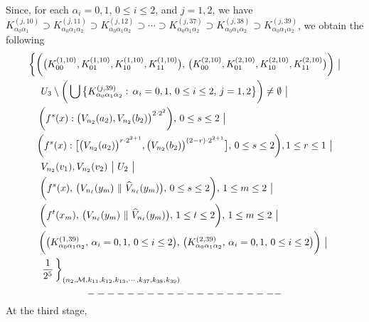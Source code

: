 \documentclass[12pt]{article}
\newcommand{\al}{\alpha}
\begin{document}
Since, for each $\al_i = 0, 1$, $0 \le i \le 2$, and $j = 1, 2$, we have $K_{\al_0\al_1}^{(j,10)} \supset K_{\al_0\al_1\al_2}^{(j,11)} \supset K_{\al_0\al_1\al_2}^{(j,12)} \supset \cdots \supset K_{\al_0\al_1\al_2}^{(j,37)} \supset K_{\al_0\al_1\al_2}^{(j,38)} \supset K_{\al_0\al_1\al_2}^{(j,39)}$, we obtain the following
\begin{multline*}
$$
\bigg\{ \bigg(\big(K_{00}^{(1,10)}, K_{01}^{(1,10)}, K_{10}^{(1,10)}, K_{11}^{(1,10)}\big), \, \big(K_{00}^{(2,10)}, K_{01}^{(2,10)}, K_{10}^{(2,10)}, K_{11}^{(2,10)}\big)\bigg) \,\, \big| \\ 
U_3 \setminus \bigg( \bigcup \big\{ K_{\al_0\al_1\al_2}^{(j,39)}: \, \al_i = 0, 1, \, 0 \le i \le 2, \, j = 1, 2 \big\} \bigg) \ne \emptyset \,\, \big| \qquad\quad\,\,\,\,\,\,\, \\ 
\quad\qquad\,\, \bigg(f^s(x) : \big(V_{n_2}(a_2), V_{n_2}(b_2)\big)^{2 \cdot 2^2}\bigg), \, 0 \le s \le 2 \,\, \big| \qquad\qquad\qquad\qquad\qquad\qquad\quad\quad\, \\
\, \bigg(f^s(x) : \big[\big(V_{n_2}(a_2)\big)^{r \cdot 2^{2+1}}, \big(V_{n_2}(b_2)\big)^{(2-r) \cdot 2^{2+1}}\big], \, 0 \le s \le 2\bigg), 1 \le r \le 1 \,\, \big| \, \\
\,\, V_{n_2}(v_1), V_{n_2}(v_2) \,\, \big| \,\, U_2 \,\, \big|  \qquad\qquad\qquad\qquad\qquad\qquad\qquad\qquad\qquad\quad\quad\,\, \\ 
\,\, \bigg(f^{s}(x), \, \big(V_{n_\ell}(y_m) \,\, \| \,\, \widehat V_{n_\ell}(y_m)\big), \, 0 \le s \le 2\bigg), \, 1 \le m \le 2 \,\, \big| \qquad\qquad\qquad\, \\ 
\,\,\bigg(f^t(x_m), \, \big(V_{n_\ell}(y_m) \,\, \| \,\, \widehat V_{n_\ell}(y_m)\big), \, 1 \le t \le 2 \bigg), \, 1 \le m \le 2 \,\, \big| \qquad\quad\quad\quad\,\,\,\, \\
\,\,\,\, \bigg(\big(K_{\al_0\al_1\al_2}^{(1,39)}, \, \al_i = 0,1, \, 0 \le i \le 2\big), \, \big(K_{\al_0\al_1\al_2}^{(2,39)}, \, \al_i = 0, 1, \, 0 \le i \le 2\big)\bigg) \,\, \big| \quad \\
\,\, \frac 1{2^5} \, \bigg\}_{(n_2,\mathcal M,k_{11},k_{12},k_{13}, \cdots, k_{37},k_{38},k_{39})} \qquad\qquad\qquad\qquad\qquad\qquad\qquad\quad\,\,\,
$$
\end{multline*}
$$--------------------\vspace{.1in}$$
\indent At the third stage, 
\end{document}
